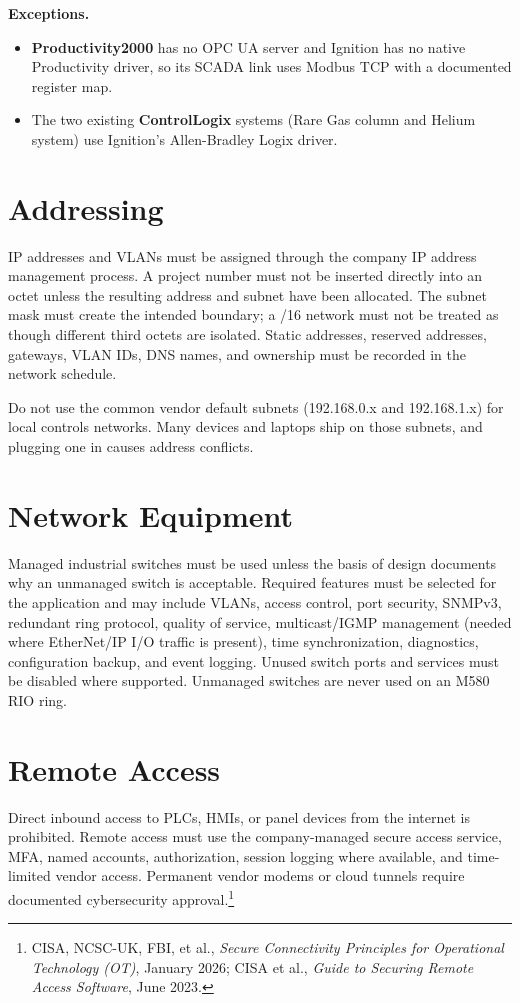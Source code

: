\textbf{Exceptions.}
\begin{itemize}[itemsep=1pt]
  \item \textbf{Productivity2000} has no OPC UA server and Ignition has no native Productivity driver, so its SCADA link uses Modbus TCP with a documented register map.
  \item The two existing \textbf{ControlLogix} systems (Rare Gas column and Helium system) use Ignition's Allen-Bradley Logix driver.
\end{itemize}

\section{Addressing}
IP addresses and VLANs must be assigned through the company IP address management process. A project number must not be inserted directly into an octet unless the resulting address and subnet have been allocated. The subnet mask must create the intended boundary; a /16 network must not be treated as though different third octets are isolated. Static addresses, reserved addresses, gateways, VLAN IDs, DNS names, and ownership must be recorded in the network schedule.

Do not use the common vendor default subnets (192.168.0.x and 192.168.1.x) for local controls networks. Many devices and laptops ship on those subnets, and plugging one in causes address conflicts.

\section{Network Equipment}
Managed industrial switches must be used unless the basis of design documents why an unmanaged switch is acceptable. Required features must be selected for the application and may include VLANs, access control, port security, SNMPv3, redundant ring protocol, quality of service, multicast/IGMP management (needed where EtherNet/IP I/O traffic is present), time synchronization, diagnostics, configuration backup, and event logging. Unused switch ports and services must be disabled where supported. Unmanaged switches are never used on an M580 RIO ring.

\section{Remote Access}\label{sec:remote-access}
Direct inbound access to PLCs, HMIs, or panel devices from the internet is prohibited. Remote access must use the company-managed secure access service, MFA, named accounts, authorization, session logging where available, and time-limited vendor access. Permanent vendor modems or cloud tunnels require documented cybersecurity approval.\footnote{CISA, NCSC-UK, FBI, et al., \emph{Secure Connectivity Principles for Operational Technology (OT)}, January 2026; CISA et al., \emph{Guide to Securing Remote Access Software}, June 2023.}

